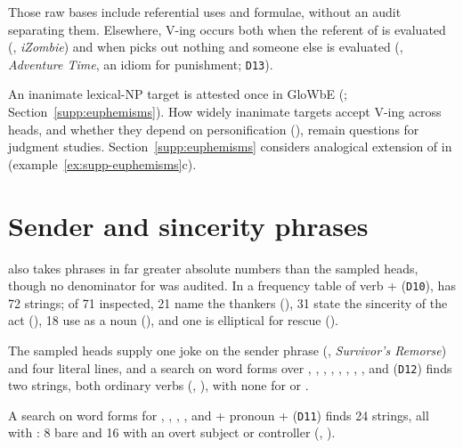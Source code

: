 \documentclass[12pt]{article}
\begin{document}
Those raw bases include referential uses and formulae, without an audit separating them. Elsewhere,  V-ing occurs both when the referent of  is evaluated (, \emph{iZombie}) and when  picks out nothing and someone else is evaluated (, \emph{Adventure Time}, an idiom for punishment; \texttt{D13}).



An inanimate lexical-NP target is attested once in GloWbE (; Section~\ref{supp:euphemisms}). How widely inanimate targets accept  V-ing across heads, and whether they depend on personification (), remain questions for judgment studies. Section~\ref{supp:euphemisms} considers analogical extension of  in  (example~\ref{ex:supp-euphemisms}c).

\section{Sender and sincerity  phrases}\label{supp:from}

 also takes  phrases in far greater absolute numbers than the sampled heads, though no denominator for  was audited. In a frequency table of verb +  (\texttt{D10}),  has 72 strings; of 71 inspected, 21 name the thankers (), 31 state the sincerity of the act (), 18 use  as a noun (), and one is elliptical for rescue ().

The sampled heads supply one joke on the sender phrase (, \emph{Survivor's Remorse}) and four literal  lines, and a search on word forms over , , , , , , , ,  and  (\texttt{D12}) finds two strings, both ordinary verbs (, ), with none for  or .

A search on word forms for , , , ,  and  + pronoun +  (\texttt{D11}) finds 24 strings, all with : 8 bare  and 16 with an overt subject or controller (, ).
\end{document}
